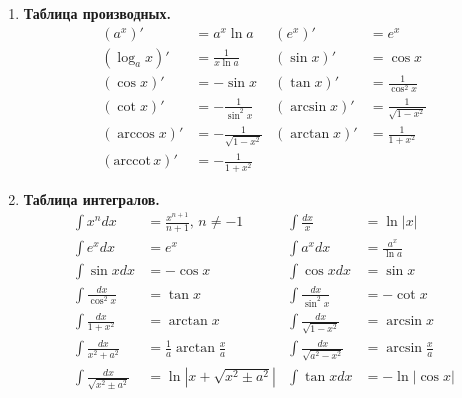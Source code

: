 \begin{enumerate}
\begin{enumerate}
        \item \textbf{Йенсен} если $f$ выпуклая:
        \[
            f(E[X]) \leq E[f(X)]
        \]
        
        \item \textbf{КБШ (для с.в.):}
        \[
            |E[XY]|^2 \leq E[X^2] \cdot E[Y^2]
        \]
        Следствие: $|\text{Cov}(X,Y)|^2 \leq \text{Var}(X) \cdot \text{Var}(Y)$
    \end{enumerate}

    \item \textbf{Таблица производных.}
    \begin{align*}
        (a^x)' &= a^x \ln a & (e^x)' &= e^x \\
        (\log_a x)' &= \frac{1}{x \ln a} & (\sin x)' &= \cos x \\
        (\cos x)' &= -\sin x & (\tan x)' &= \frac{1}{\cos^2 x} \\
        (\cot x)' &= -\frac{1}{\sin^2 x} & (\arcsin x)' &= \frac{1}{\sqrt{1-x^2}} \\
        (\arccos x)' &= -\frac{1}{\sqrt{1-x^2}} & (\arctan x)' &= \frac{1}{1+x^2} \\
        (\text{arccot}\, x)' &= -\frac{1}{1+x^2}
    \end{align*}

    \item \textbf{Таблица интегралов.}
    {\small
    \begin{align*}
        \int x^n dx &= \frac{x^{n+1}}{n+1},\, n \neq -1 & 
        \int \frac{dx}{x} &= \ln|x| \\
        \int e^x dx &= e^x & 
        \int a^x dx &= \frac{a^x}{\ln a} \\
        \int \sin x dx &= -\cos x & 
        \int \cos x dx &= \sin x \\
        \int \frac{dx}{\cos^2 x} &= \tan x & 
        \int \frac{dx}{\sin^2 x} &= -\cot x \\
        \int \frac{dx}{1+x^2} &= \arctan x & 
        \int \frac{dx}{\sqrt{1-x^2}} &= \arcsin x \\
        \int \frac{dx}{x^2+a^2} &= \frac{1}{a}\arctan\frac{x}{a} & 
        \int \frac{dx}{\sqrt{a^2-x^2}} &= \arcsin\frac{x}{a} \\
        \int \frac{dx}{\sqrt{x^2 \pm a^2}} &= \ln|x + \sqrt{x^2 \pm a^2}| &
        \int \tan x dx &= -\ln|\cos x|
    \end{align*}
    }


\end{enumerate}
